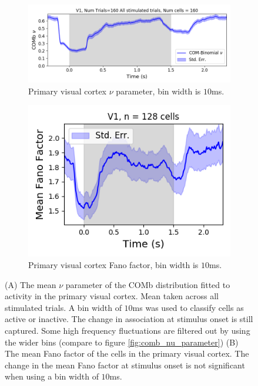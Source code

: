   \begin{figure}[p]
    \begin{subfigure}[h]{\linewidth}
      \includegraphics[width=\linewidth]{figures/conway_maxwell/v1_10ms_comb_nu_all_stimulated_trials.png}
      \caption{Primary visual cortex $\nu$ parameter, bin width is $10$ms.}
      \label{fig:v1_10ms_comb_nu_parameter}
    \end{subfigure}
    \begin{subfigure}[h]{0.5\linewidth}
      \includegraphics[width=\linewidth]{figures/conway_maxwell/v1_10ms_fano_factor.png}
      \caption{Primary visual cortex Fano factor, bin width is $10$ms.}
      \label{fig:v1_10ms_fano_factor}
    \end{subfigure}
    \caption{(A) The mean $\nu$ parameter of the COMb distribution fitted to activity in the primary visual cortex. Mean taken across all stimulated trials. A bin width of $10$ms was used to classify cells as active or inactive. The change in association at stimulus onset is still captured. Some high frequency fluctuations are filtered out by using the wider bins (compare to figure \ref{fig:comb_nu_parameter}) (B) The mean Fano factor of the cells in the primary visual cortex. The change in the mean Fano factor at stimulus onset is not significant when using a bin width of $10$ms.}
    \label{fig:effects_of_wide_bins}
  \end{figure}

